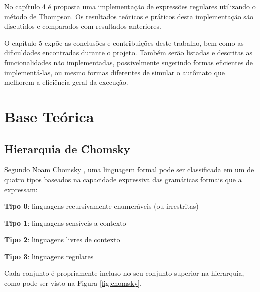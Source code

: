 \documentclass[a4paper,12pt,oneside,onecolumn]{uerj}
\begin{document}
No capítulo 4 é proposta uma implementação de expressões regulares utilizando o método de Thompson. Os resultados teóricos e práticos desta implementação são discutidos e comparados com resultados anteriores.

O capítulo 5 expõe as conclusões e contribuições deste trabalho, bem como as dificuldades encontradas durante o projeto. Também serão listadas e descritas as funcionalidades não implementadas, possivelmente sugerindo formas eficientes de implementá-las, ou mesmo formas diferentes de simular o autômato que melhorem a eficiência geral da execução.

\chapter{Base Teórica}

\section{Hierarquia de Chomsky}

Segundo Noam Chomsky \cite{bib:Chomsky57}, uma linguagem formal pode ser classificada em um de quatro tipos baseados na capacidade expressiva das gramáticas formais que a expressam:

\begin{lcircp}
    \item {\bf Tipo 0}: linguagens recursivamente enumeráveis (ou irrestritas)
    \item {\bf Tipo 1}: linguagens sensíveis a contexto
    \item {\bf Tipo 2}: linguagens livres de contexto
    \item {\bf Tipo 3}: linguagens regulares
\end{lcircp}

Cada conjunto é propriamente incluso no seu conjunto superior na hierarquia, como pode ser visto na Figura \ref{fig:chomsky}.
\end{document}

